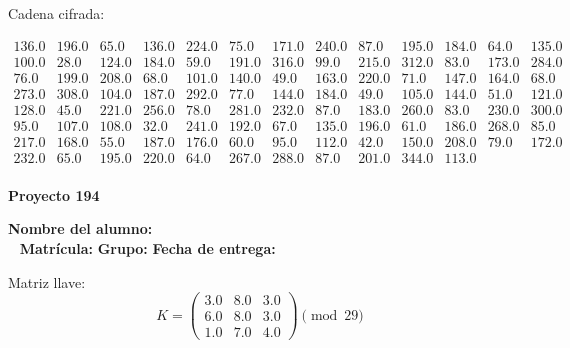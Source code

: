 \documentclass[12pt]{article}
\begin{document}
Cadena cifrada:
\begin{center}
$\begin{array}{lllllllllllll}
136.0 & 196.0 & 65.0 & 136.0 & 224.0 & 75.0 & 171.0 & 240.0 & 87.0 & 195.0 & 184.0 & 64.0 & 135.0\\
100.0 & 28.0 & 124.0 & 184.0 & 59.0 & 191.0 & 316.0 & 99.0 & 215.0 & 312.0 & 83.0 & 173.0 & 284.0\\
76.0 & 199.0 & 208.0 & 68.0 & 101.0 & 140.0 & 49.0 & 163.0 & 220.0 & 71.0 & 147.0 & 164.0 & 68.0\\
273.0 & 308.0 & 104.0 & 187.0 & 292.0 & 77.0 & 144.0 & 184.0 & 49.0 & 105.0 & 144.0 & 51.0 & 121.0\\
128.0 & 45.0 & 221.0 & 256.0 & 78.0 & 281.0 & 232.0 & 87.0 & 183.0 & 260.0 & 83.0 & 230.0 & 300.0\\
95.0 & 107.0 & 108.0 & 32.0 & 241.0 & 192.0 & 67.0 & 135.0 & 196.0 & 61.0 & 186.0 & 268.0 & 85.0\\
217.0 & 168.0 & 55.0 & 187.0 & 176.0 & 60.0 & 95.0 & 112.0 & 42.0 & 150.0 & 208.0 & 79.0 & 172.0\\
232.0 & 65.0 & 195.0 & 220.0 & 64.0 & 267.0 & 288.0 & 87.0 & 201.0 & 344.0 & 113.0\\
\end{array}$
\end{center}

\newpage


\textbf{Proyecto 194}

\textbf{Nombre del alumno:} \underline{\hspace{13cm}}\\\
\vspace{1cm}
\textbf{Matrícula:} \underline{\hspace{4cm}} \hspace{1cm}
\textbf{Grupo:} \underline{\hspace{2cm}}
\textbf{Fecha de entrega:} \underline{\hspace{2cm}}

\medskip

Matriz llave:
\[
K = \begin{pmatrix}
3.0 & 8.0 & 3.0\\
6.0 & 8.0 & 3.0\\
1.0 & 7.0 & 4.0
\end{pmatrix} \pmod{29}
\]
\end{document}
